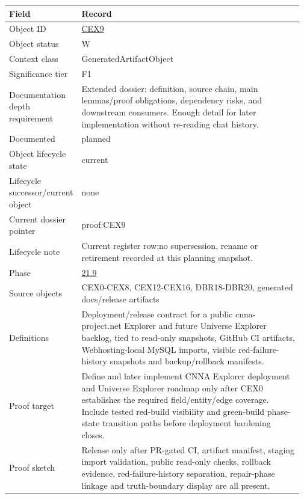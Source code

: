 \begin{longtable}{L{0.16\linewidth} L{0.81\linewidth}}
\hline
\textbf{Field} & \textbf{Record}\\
\hline
Object ID & \hyperlink{object-row-CEX9}{CEX9}\\
\hline\addlinespace[0.20em]
Object status & W\\
\hline\addlinespace[0.20em]
Context class & GeneratedArtifactObject\\
\hline\addlinespace[0.20em]
Significance tier & F1\\
\hline\addlinespace[0.20em]
Documentation depth requirement & Extended dossier: definition, source chain, main lemmas/\allowbreak{}proof obligations, dependency risks, and downstream consumers. Enough detail for later implementation without re-reading chat history.\\
\hline\addlinespace[0.20em]
Documented & planned\\
\hline\addlinespace[0.20em]
Object lifecycle state & current\\
\hline\addlinespace[0.20em]
Lifecycle successor/\allowbreak{}current object & none\\
\hline\addlinespace[0.20em]
Current dossier pointer & proof:CEX9\\
\hline\addlinespace[0.20em]
Lifecycle note & Current register row;\newline no supersession, rename or retirement recorded at this planning snapshot.\\
\hline\addlinespace[0.20em]
Phase & \hyperlink{phase-row-21-9}{21.9}\\
\hline\addlinespace[0.20em]
Source objects & CEX0-CEX8, CEX12-CEX16, DBR18-DBR20, generated docs/\allowbreak{}release artifacts\\
\hline\addlinespace[0.20em]
Definitions & Deployment/\allowbreak{}release contract for a public cnna-project.net Explorer and future Universe Explorer backlog, tied to read-only snapshots, GitHub CI artifacts, Webhosting-local MySQL imports, visible red-failure-history snapshots and backup/\allowbreak{}rollback manifests.\\
\hline\addlinespace[0.20em]
Proof target & Define and later implement CNNA Explorer deployment and Universe Explorer roadmap only after CEX0 establishes the required field/\allowbreak{}entity/\allowbreak{}edge coverage. Include tested red-build visibility and green-build phase-state transition paths before deployment hardening closes.\\
\hline\addlinespace[0.20em]
Proof sketch & Release only after PR-gated CI, artifact manifest, staging import validation, public read-only checks, rollback evidence, red-failure-history separation, repair-phase linkage and truth-boundary display are all present.\\

\end{longtable}
